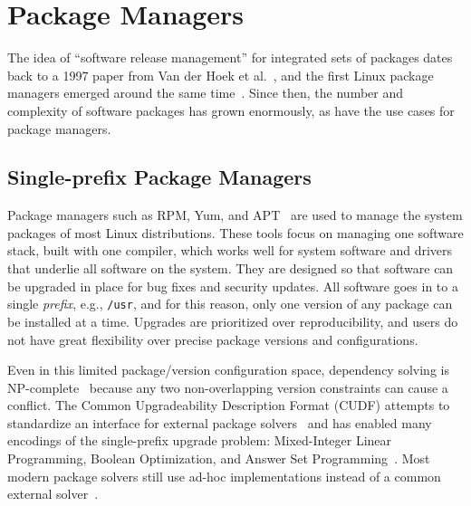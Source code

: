\section{Package Managers}
\label{sec:package-managers}

The idea of ``software release management'' for integrated sets of packages dates back to
a 1997 paper from Van der Hoek et al.~\cite{van1997software}, and the first Linux
package managers emerged around the same time~\cite{rpm,apt}. Since then, the number and
complexity of software packages has grown enormously, as have the use cases for package
managers.

\subsection{Single-prefix Package Managers}

Package managers such as RPM, Yum, and APT~\cite{foster+:rpm03,silva:apt01,yum} are used
to manage the system packages of most Linux distributions. These tools focus on managing
one software stack, built with one compiler, which works well for system software and
drivers that underlie all software on the system. They are designed so that software can
be upgraded in place for bug fixes and security updates. All software goes in to a single
{\it prefix}, e.g., {\tt /usr}, and for this reason, only one version of any package can
be installed at a time. Upgrades are prioritized over reproducibility, and users do not
have great flexibility over precise package versions and configurations.

Even in this limited package/version configuration space, dependency solving is
NP-complete~\cite{dicosmo:edos,mancinelli+:ase06-foss-distros} because any two
non-overlapping version constraints can cause a conflict. The Common Upgradeability
Description Format (CUDF) attempts to standardize an interface for external package
solvers~\cite{abate2012dependency,abate-2013-modular-package-manager} and has enabled
many encodings of the single-prefix upgrade problem: Mixed-Integer Linear Programming,
Boolean Optimization, and Answer Set
Programming~\cite{tucker+:icse07-opium,michel+:lococo2010,argelich+:lococo2010,gebser+:2011-aspcud}.
Most modern package solvers still use ad-hoc implementations instead of a common
external solver~\cite{abate2020dependency}.


